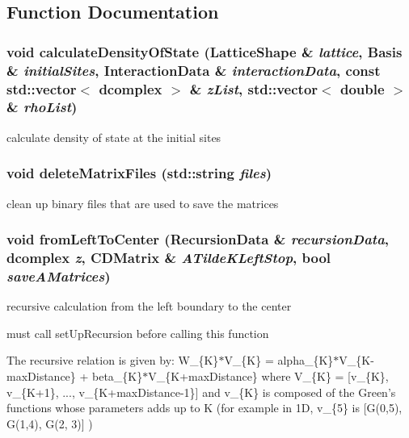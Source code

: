 \subsection{Function Documentation}
\subsubsection{\setlength{\rightskip}{0pt plus 5cm}void calculate\-Density\-Of\-State (\bf{Lattice\-Shape} \& {\em lattice}, \bf{Basis} \& {\em initial\-Sites}, \bf{Interaction\-Data} \& {\em interaction\-Data}, const std::vector$<$ \bf{dcomplex} $>$ \& {\em z\-List}, std::vector$<$ double $>$ \& {\em rho\-List})}\label{recursiveCalculation_8h_606df39775b7266829a71b5550656fb1}


calculate density of state at the initial sites 
\subsubsection{\setlength{\rightskip}{0pt plus 5cm}void delete\-Matrix\-Files (std::string {\em files})}\label{recursiveCalculation_8h_09bb0743532eb10149446411001b1a13}


clean up binary files that are used to save the matrices 
\subsubsection{\setlength{\rightskip}{0pt plus 5cm}void from\-Left\-To\-Center (\bf{Recursion\-Data} \& {\em recursion\-Data}, \bf{dcomplex} {\em z}, \bf{CDMatrix} \& {\em ATilde\-KLeft\-Stop}, bool {\em save\-AMatrices})}\label{recursiveCalculation_8h_37b7dd15b0d491f5c830153780c3b0b9}


recursive calculation from the left boundary to the center

must call set\-Up\-Recursion before calling this function 

The recursive relation is given by: W\_\-\{K\}$\ast$V\_\-\{K\} = alpha\_\-\{K\}$\ast$V\_\-\{K-max\-Distance\} + beta\_\-\{K\}$\ast$V\_\-\{K+max\-Distance\} where V\_\-\{K\} = [v\_\-\{K\}, v\_\-\{K+1\}, ..., v\_\-\{K+max\-Distance-1\}] and v\_\-\{K\} is composed of the Green's functions whose parameters adds up to K (for example in 1D, v\_\-\{5\} is [G(0,5), G(1,4), G(2, 3)] )


